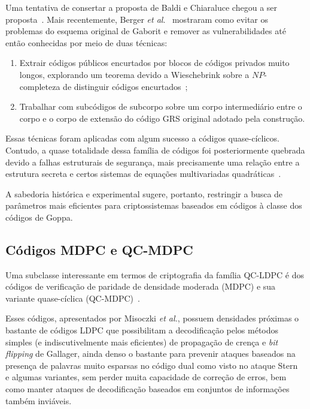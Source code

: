 \documentclass{SBCbookchapter}
\begin{document}
\begin{otherlanguage}{brazilian}
Uma tentativa de consertar a proposta de Baldi e Chiaraluce chegou a ser proposta~\cite{baldi-chiaraluce-bodrato}. Mais recentemente, Berger \emph{et al}.~\cite{berger-cayrel-gaborit-otmani} mostraram como evitar os problemas do esquema original de Gaborit e remover as vulnerabilidades até então conhecidas por meio de duas técnicas: 
\begin{enumerate}
	\item Extrair códigos públicos encurtados por blocos de códigos privados muito longos, explorando um teorema devido a Wieschebrink sobre a $NP$-completeza de distinguir códigos encurtados~\cite{wieschebrink};
	\item Trabalhar com subcódigos de subcorpo sobre um corpo intermediário entre o corpo e o corpo de extensão do código GRS original adotado pela construção.
\end{enumerate}
Essas técnicas foram aplicadas com algum sucesso a códigos quase-cíclicos. Contudo, a quase totalidade dessa família de códigos foi posteriormente quebrada devido a falhas estruturais de segurança, mais precisamente uma relação entre a estrutura secreta e certos sistemas de equações multivariadas quadráticas~\cite{faugere-otmani-perret-tillich}.

A sabedoria histórica e experimental sugere, portanto, restringir a busca de \\parâmetros mais eficientes para criptossistemas baseados em códigos à classe dos códigos de Goppa.

\subsection{Códigos MDPC e QC-MDPC}\label{subsec:qcmdpc}

Uma subclasse interessante em termos de criptografia da família QC-LDPC é dos códigos de verificação de paridade de densidade moderada (MDPC) e sua variante quase-cíclica (QC-MDPC)~\cite{misoczki-sendrier-tillich-barreto}.

Esses códigos, apresentados por Misoczki \emph{et al.}, possuem densidades próximas o bastante de códigos LDPC que possibilitam a decodificação pelos métodos simples (e indiscutivelmente mais eficientes) de propagação de crença e \emph{bit flipping} de Gallager, ainda denso o bastante para prevenir ataques baseados na presença de palavras muito esparsas no código dual como visto no ataque Stern~\cite{stern} e algumas variantes, sem perder muita capacidade de correção de erros, bem como manter ataques de decodificação baseados em conjuntos de informações~\cite{bernstein-lange-peters,bernstein-lange-peters:bcd} também inviáveis. 


\end{otherlanguage}
\end{document}
